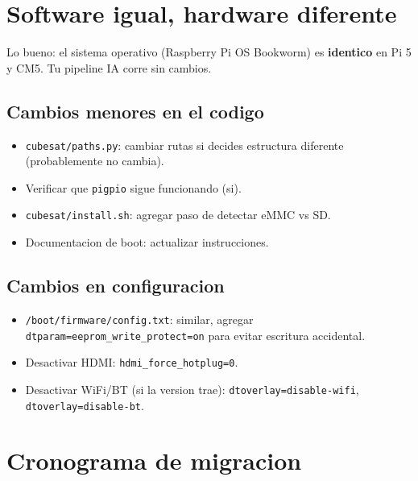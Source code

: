 \documentclass[11pt,a4paper,oneside,openright]{book}
\begin{document}
\chapter{Software igual, hardware diferente}

Lo bueno: el sistema operativo (Raspberry Pi OS Bookworm) es \textbf{identico}
en Pi 5 y CM5. Tu pipeline IA corre sin cambios.

\section{Cambios menores en el codigo}

\begin{itemize}[leftmargin=2em]
  \item \texttt{cubesat/paths.py}: cambiar rutas si decides estructura
        diferente (probablemente no cambia).
  \item Verificar que \texttt{pigpio} sigue funcionando (si).
  \item \texttt{cubesat/install.sh}: agregar paso de detectar eMMC vs SD.
  \item Documentacion de boot: actualizar instrucciones.
\end{itemize}

\section{Cambios en configuracion}

\begin{itemize}[leftmargin=2em]
  \item \texttt{/boot/firmware/config.txt}: similar, agregar
        \texttt{dtparam=eeprom\_write\_protect=on} para evitar escritura
        accidental.
  \item Desactivar HDMI: \texttt{hdmi\_force\_hotplug=0}.
  \item Desactivar WiFi/BT (si la version trae): \texttt{dtoverlay=disable-wifi},
        \texttt{dtoverlay=disable-bt}.
\end{itemize}

\chapter{Cronograma de migracion}
\end{document}
